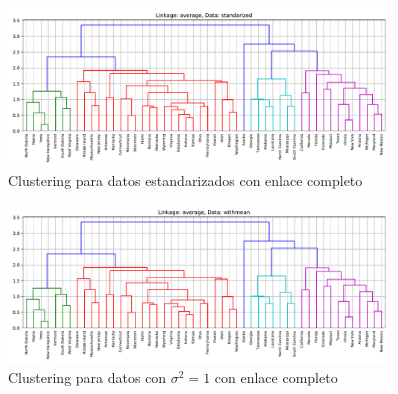\documentclass[11pt]{article}
\begin{document}
\begin{figure}[H]
    \centering
    \includegraphics[width = 0.90\textwidth]{2-averagestandarized.pdf}
    \caption{Clustering para datos estandarizados con enlace completo}
    \label{2-averagestandarized}
\end{figure}
\begin{figure}[H]
    \centering
    \includegraphics[width = 0.90\textwidth]{2-averagewithmean.pdf}
    \caption{Clustering para datos con $\sigma^2 = 1$ con enlace completo}
    \label{2-averagewithmean}
\end{figure}
\end{document}
